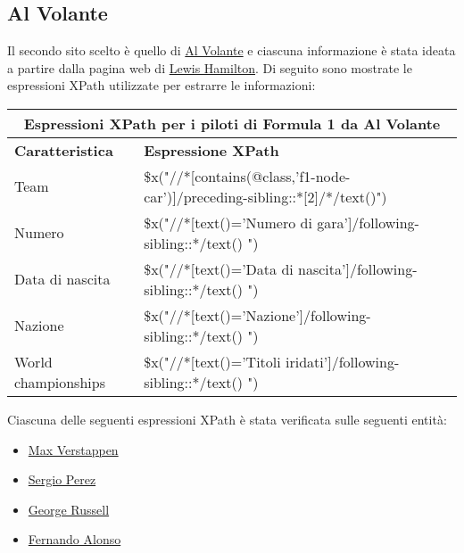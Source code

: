 \documentclass[12pt, letterpaper]{article}
\begin{document}
\subsection{Al Volante}
Il secondo sito scelto è quello di \href{https://www.alvolante.it}{Al Volante} e ciascuna informazione è stata ideata a partire dalla pagina web di \href{https://www.alvolante.it/formula1/piloti/lewis-hamilton}{Lewis Hamilton}. Di seguito sono mostrate le espressioni XPath utilizzate per estrarre le informazioni: 
\begin{center}
\begin{table}[!h]
\begin{tabular}{ |p{3cm}|p{9cm}| }
\hline
\multicolumn{2}{|c|}{\textbf{Espressioni XPath per i piloti di Formula 1 da Al Volante}} \\
\hline
 \hline
\textbf{Caratteristica} & \textbf{Espressione XPath} \\[1ex]
 \hline\hline
Team & \$x("//*[contains(@class,'f1-node-car')]/preceding-sibling::*[2]/*/text()") \\
Numero & \$x("//*[text()='Numero di gara']/following-sibling::*/text() ")  \\
Data di nascita & \$x("//*[text()='Data di nascita']/following-sibling::*/text() ") \\
Nazione & \$x("//*[text()='Nazione']/following-sibling::*/text() ") \\
World championships & \$x("//*[text()='Titoli iridati']/following-sibling::*/text() ") \\
 \hline
\end{tabular}
\end{table}
\end{center}

Ciascuna delle seguenti espressioni XPath è stata verificata sulle seguenti entità:
\begin{itemize}
    \item \href{https://www.alvolante.it/formula1/piloti/max-verstappen}{Max Verstappen}
    \item \href{https://www.alvolante.it/formula1/piloti/sergio-perez}{Sergio Perez}
    \item \href{https://www.alvolante.it/formula1/piloti/george-russell}{George Russell}
    \item \href{https://www.alvolante.it/formula1/piloti/fernando-alonso}{Fernando Alonso}
\end{itemize}
\end{document}
